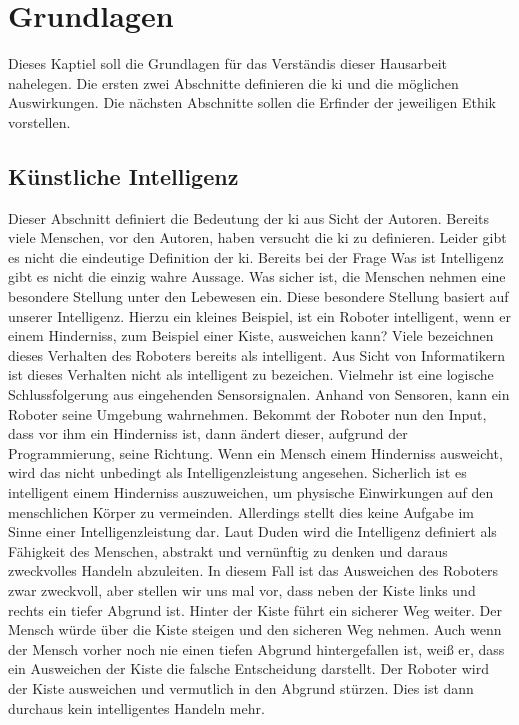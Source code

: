 \section{Grundlagen}
Dieses Kaptiel soll die Grundlagen für das Verständis dieser Hausarbeit nahelegen. Die ersten zwei Abschnitte definieren die \ac{ki} und die möglichen Auswirkungen. Die nächsten Abschnitte sollen die \glqq Erfinder\grqq{} der jeweiligen Ethik vorstellen. 


\subsection{Künstliche Intelligenz}
Dieser Abschnitt definiert die Bedeutung der \ac{ki} aus Sicht der Autoren. Bereits viele Menschen, vor den Autoren, haben versucht die \ac{ki} zu definieren. Leider gibt es nicht die eindeutige Definition der \ac{ki}. Bereits bei der Frage \glqq Was ist Intelligenz\grqq{} gibt es nicht die einzig wahre Aussage. Was sicher ist, die Menschen nehmen eine besondere Stellung unter den Lebewesen ein. Diese besondere Stellung basiert auf unserer Intelligenz. \linebreak 
Hierzu ein kleines Beispiel, ist ein Roboter intelligent, wenn er einem Hinderniss, zum Beispiel einer Kiste, ausweichen kann?  Viele bezeichnen dieses Verhalten des Roboters bereits als intelligent. Aus Sicht von Informatikern ist dieses Verhalten nicht als intelligent zu bezeichen. Vielmehr ist eine logische Schlussfolgerung aus eingehenden Sensorsignalen. Anhand von Sensoren, kann ein Roboter seine Umgebung wahrnehmen. Bekommt der Roboter nun den Input, dass vor ihm ein Hinderniss ist, dann ändert dieser, aufgrund der Programmierung, seine Richtung. Wenn ein Mensch einem Hinderniss ausweicht, wird das nicht unbedingt als Intelligenzleistung angesehen. Sicherlich ist es intelligent einem Hinderniss auszuweichen, um physische Einwirkungen auf den menschlichen Körper zu vermeinden. Allerdings stellt dies keine Aufgabe im Sinne einer Intelligenzleistung dar. Laut Duden wird die Intelligenz definiert als \glqq Fähigkeit des Menschen, abstrakt und vernünftig zu denken und daraus zweckvolles Handeln abzuleiten\grqq. In diesem Fall ist das Ausweichen des Roboters zwar zweckvoll, aber stellen wir uns mal vor, dass neben der Kiste links und rechts ein tiefer Abgrund ist. Hinter der Kiste führt ein sicherer Weg weiter. Der Mensch würde über die Kiste steigen und den sicheren Weg nehmen. Auch wenn der Mensch vorher noch nie einen tiefen Abgrund hintergefallen ist, weiß er, dass ein Ausweichen der Kiste die falsche Entscheidung darstellt. Der Roboter  wird der Kiste ausweichen und vermutlich in den Abgrund stürzen. Dies ist dann durchaus kein intelligentes Handeln mehr. \linebreak 

